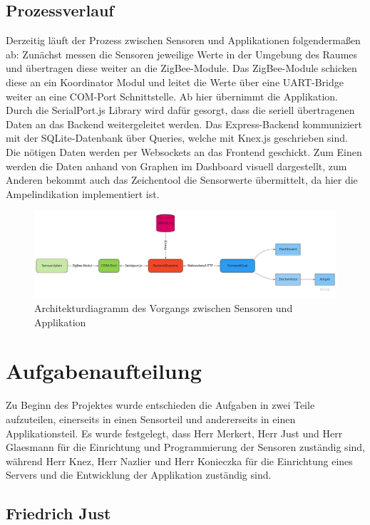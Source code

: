 \documentclass[]{article}
\begin{document}
	\subsection{Prozessverlauf}
	Derzeitig läuft der Prozess zwischen Sensoren und Applikationen folgendermaßen ab:\newline
	Zunächst messen die Sensoren jeweilige Werte in der Umgebung des Raumes und übertragen diese weiter an die ZigBee-Module. Das ZigBee-Module schicken diese an ein Koordinator Modul und leitet die Werte über eine UART-Bridge weiter an eine COM-Port Schnittstelle. Ab hier übernimmt die Applikation. Durch die SerialPort.js Library wird dafür gesorgt, dass die seriell übertragenen Daten an das Backend weitergeleitet werden. Das Express-Backend kommuniziert mit der SQLite-Datenbank über Queries, welche mit Knex.js geschrieben sind. Die nötigen Daten werden per Websockets an das Frontend geschickt. %
	Zum Einen werden die Daten anhand von Graphen im Dashboard visuell dargestellt, zum Anderen bekommt auch das Zeichentool die Sensorwerte übermittelt, da hier die Ampelindikation implementiert ist. 
	\begin{figure}[!h]
		\centering
		\includegraphics[scale=0.223]{images/DocArchitectureDiagram}
		\caption{Architekturdiagramm des Vorgangs zwischen Sensoren und Applikation}
		\label{img:DocArchitectureDiagram}
	\end{figure}
	\newpage
	\section{Aufgabenaufteilung} %
	Zu Beginn des Projektes wurde entschieden die Aufgaben in zwei Teile aufzuteilen, einerseits in einen Sensorteil und andererseits in einen Applikationsteil. Es wurde festgelegt, dass Herr Merkert, Herr Just und Herr Glaesmann für die Einrichtung und Programmierung der Sensoren zuständig sind, während Herr Knez, Herr Nazlier und Herr Konieczka für die Einrichtung eines Servers und die Entwicklung der Applikation zuständig sind. 
		\subsection{Friedrich Just}
\end{document}
